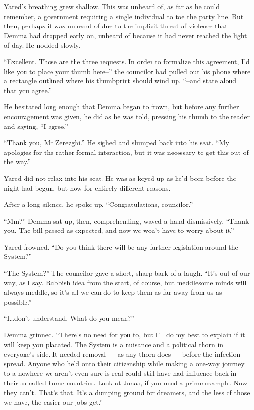 Yared's breathing grew shallow. This was unheard of, as far as he could remember, a government requiring a single individual to toe the party line. But then, perhaps it was unheard of due to the implicit threat of violence that Demma had dropped early on, unheard of because it had never reached the light of day. He nodded slowly.

``Excellent. Those are the three requests. In order to formalize this agreement, I'd like you to place your thumb here--'' the councilor had pulled out his phone where a rectangle outlined where his thumbprint should wind up. ``--and state aloud that you agree.''

He hesitated long enough that Demma began to frown, but before any further encouragement was given, he did as he was told, pressing his thumb to the reader and saying, ``I agree.''

``Thank you, Mr Zerezghi.'' He sighed and slumped back into his seat. ``My apologies for the rather formal interaction, but it was necessary to get this out of the way.''

Yared did not relax into his seat. He was as keyed up as he'd been before the night had begun, but now for entirely different reasons.

After a long silence, he spoke up. ``Congratulations, councilor.''

``Mm?'' Demma sat up, then, comprehending, waved a hand dismissively. ``Thank you. The bill passed as expected, and now we won't have to worry about it.''

Yared frowned. ``Do you think there will be any further legislation around the System?''

``The System?'' The councilor gave a short, sharp bark of a laugh. ``It's out of our way, as I say. Rubbish idea from the start, of course, but meddlesome minds will always meddle, so it's all we can do to keep them as far away from us as possible.''

``I\ldots don't understand. What do you mean?''

Demma grinned. ``There's no need for you to, but I'll do my best to explain if it will keep you placated. The System is a nuisance and a political thorn in everyone's side. It needed removal — as any thorn does — before the infection spread. Anyone who held onto their citizenship while making a one-way journey to a nowhere we aren't even sure is real could still have had influence back in their so-called home countries. Look at Jonas, if you need a prime example. Now they can't. That's that. It's a dumping ground for dreamers, and the less of those we have, the easier our jobs get.''

